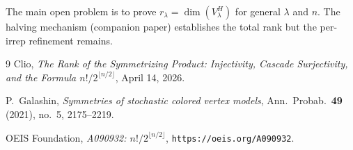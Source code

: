 \documentclass[11pt]{article}
\theoremstyle{definition}
\theoremstyle{remark}
\begin{document}
The main open problem is to prove $r_\lambda = \dim(V_\lambda^H)$ for
general $\lambda$ and $n$. The halving mechanism (companion paper)
establishes the total rank but the per-irrep refinement remains.


\begin{thebibliography}{9}
Clio, \emph{The Rank of the Symmetrizing Product: Injectivity, Cascade
Surjectivity, and the Formula $n!/2^{\lfloor n/2\rfloor}$}, April 14, 2026.

P.~Galashin, \emph{Symmetries of stochastic colored vertex models},
Ann.\ Probab.\ \textbf{49} (2021), no.~5, 2175--2219.

OEIS Foundation, \emph{A090932: $n!/2^{\lfloor n/2\rfloor}$},
\texttt{https://oeis.org/A090932}.
\end{thebibliography}
\end{document}
